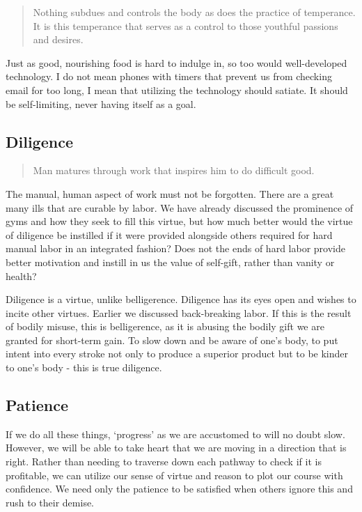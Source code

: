 \documentclass[letterpaper]{article}
\begin{document}
\begin{quote}
  Nothing subdues and controls the body as does the practice of temperance. It is this temperance that serves as a control to those youthful passions and desires.
\end{quote}

Just as good, nourishing food is hard to indulge in, so too would well-developed technology. I do not mean phones with timers that prevent us from checking email for too long, I mean that utilizing the technology should satiate. It should be self-limiting, never having itself as a goal.

\subsection{Diligence}

\begin{quote}
  Man matures through work that inspires him to do difficult good.
\end{quote}

The manual, human aspect of work must not be forgotten. There are a great many ills that are curable by labor. We have already discussed the prominence of gyms and how they seek to fill this virtue, but how much better would the virtue of diligence be instilled if it were provided alongside others required for hard manual labor in an integrated fashion? Does not the ends of hard labor provide better motivation and instill in us the value of self-gift, rather than vanity or health?

Diligence is a virtue, unlike belligerence. Diligence has its eyes open and wishes to incite other virtues. Earlier we discussed back-breaking labor. If this is the result of bodily misuse, this is belligerence, as it is abusing the bodily gift we are granted for short-term gain. To slow down and be aware of one's body, to put intent into every stroke not only to produce a superior product but to be kinder to one's body - this is true diligence.

\subsection{Patience}

If we do all these things, `progress' as we are accustomed to will no doubt slow. However, we will be able to take heart that we are moving in a direction that is right. Rather than needing to traverse down each pathway to check if it is profitable, we can utilize our sense of virtue and reason to plot our course with confidence. We need only the patience to be satisfied when others ignore this and rush to their demise.
\end{document}
